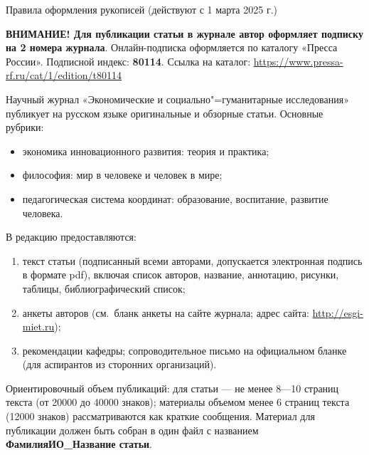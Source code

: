 
\label{authors:start}

\renewcommand{\esgiSecName}{К сведению авторов}

\renewcommand{\esgiSecNameEn}{For the Authors}

\vspace{-1em}
\esgiSection{}{\esgiSecName}

\begin{center}
    Правила оформления рукописей
(действуют с 1 марта 2025 г.)
\end{center}




\begin{multicols}{2}

    \textbf{ВНИМАНИЕ! Для публикации статьи
    в журнале автор оформляет подписку на
    2 номера журнала}. Онлайн-подписка оформляется по каталогу «Пресса России». Подписной индекс: \textbf{80114}. Ссылка на каталог:
    \url{https://www.pressa-rf.ru/cat/1/edition/t80114}

    Научный журнал «Экономические и социально"=гуманитарные исследования» публикует на русском языке оригинальные и обзорные статьи. Основные рубрики:
\begin{itemize}
    \item  экономика инновационного развития:
    теория и практика;
    \item  философия: мир в человеке и человек
    в мире;
    \item  педагогическая система координат: образование, воспитание, развитие человека.
\end{itemize}    

    В редакцию предоставляются:
\begin{enumerate}
    \item текст статьи (подписанный всеми авторами, допускается электронная подпись
    в формате pdf), включая список авторов, название, аннотацию, рисунки, таблицы, библиографический список;
    \item  анкеты авторов (см. бланк анкеты на
    сайте журнала; адрес сайта: \url{http://esgi-miet.ru});
    \item  рекомендации кафедры; сопроводительное письмо на официальном бланке
    (для аспирантов из сторонних организаций).
\end{enumerate}
    Ориентировочный объем публикаций: для
    статьи — не менее 8—10 страниц текста
    (от \num{20000} до \num{40000} знаков); материалы объемом менее 6 страниц текста (\num{12000} знаков)
    рассматриваются как краткие сообщения.
    Материал для публикации должен быть
    собран в один файл с названием \textbf{ФамилияИО\_Название статьи}.


\end{multicols}
